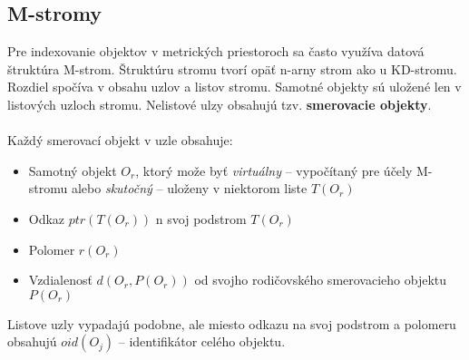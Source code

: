 \documentclass[12pt,oneside]{fithesis2}
\begin{document}
\subsection{M-stromy}
   Pre indexovanie objektov v metrických priestoroch sa často využíva datová štruktúra M-strom. Štruktúru stromu tvorí opäť n-arny strom ako u KD-stromu. Rozdiel spočíva v obsahu uzlov a listov stromu. Samotné objekty sú uložené len v listových uzloch stromu. Nelistové ulzy obsahujú tzv. \textbf{smerovacie objekty}. \\\\
Každý smerovací objekt v uzle obsahuje:
\begin{itemize}
\item Samotný objekt $O_r$, ktorý može byť \textit{virtuálny} -- vypočítaný pre účely M-stromu alebo \textit{skutočný} -- uloženy v niektorom liste $T(O_r)$
\item Odkaz $ptr(T(O_r))$ n svoj podstrom $T(O_r)$
\item Polomer $r(O_r)$
\item Vzdialenosť $d(O_r,P(O_r))$  od svojho rodičovského smerovacieho objektu $P(O_r)$
\end{itemize}
Listove uzly vypadajú podobne, ale miesto odkazu na svoj podstrom a polomeru obsahujú $oid(O_j)$ -- identifikátor celého objektu.\\
\end{document}
